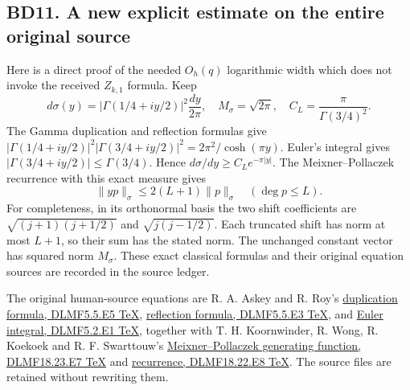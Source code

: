 \documentclass[11pt]{article}
\begin{document}
\subsection{BD11. A new explicit estimate on the entire original source}\label{bd11.-a-new-explicit-estimate-on-the-entire-original-source}

Here is a direct proof of the needed \(O_h(q)\) logarithmic width which does not invoke the received \(Z_{k,1}\) formula. Keep \[
d\sigma(y)=|\Gamma(1/4+iy/2)|^2\frac{dy}{2\pi},\quad
M_\sigma=\sqrt{2\pi},\quad C_L=\frac{\pi}{\Gamma(3/4)^2}.
\] The Gamma duplication and reflection formulas give \(|\Gamma(1/4+iy/2)|^2|\Gamma(3/4+iy/2)|^2=2\pi^2/\cosh(\pi y)\). Euler's integral gives \(|\Gamma(3/4+iy/2)|\le\Gamma(3/4)\). Hence \(d\sigma/dy\ge C_Le^{-\pi|y|}\). The Meixner--Pollaczek recurrence with this exact measure gives \[
\|yp\|_\sigma\le2(L+1)\|p\|_\sigma\quad(\deg p\le L). \tag{BD17}
\] For completeness, in its orthonormal basis the two shift coefficients are \(\sqrt{(j+1)(j+1/2)}\) and \(\sqrt{j(j-1/2)}\). Each truncated shift has norm at most \(L+1\), so their sum has the stated norm. The unchanged constant vector has squared norm \(M_\sigma\). These exact classical formulas and their original equation sources are recorded in the source ledger.

The original human-source equations are R. A. Askey and R. Roy's \href{https://dlmf.nist.gov/5.5.E5.tex}{duplication formula, DLMF5.5.E5 TeX}, \href{https://dlmf.nist.gov/5.5.E3.tex}{reflection formula, DLMF5.5.E3 TeX}, and \href{https://dlmf.nist.gov/5.2.E1.tex}{Euler integral, DLMF5.2.E1 TeX}, together with T. H. Koornwinder, R. Wong, R. Koekoek and R. F. Swarttouw's \href{https://dlmf.nist.gov/18.23.E7.tex}{Meixner--Pollaczek generating function, DLMF18.23.E7 TeX} and \href{https://dlmf.nist.gov/18.22.E8.tex}{recurrence, DLMF18.22.E8 TeX}. The source files are retained without rewriting them.
\end{document}
